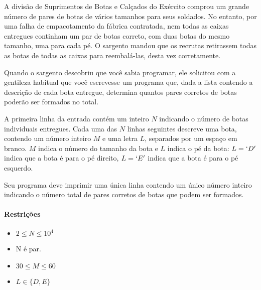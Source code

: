 %
%
%

A divisão de Suprimentos de Botas e Calçados do Exército comprou um grande número de pares de botas de vários tamanhos para seus soldados. No entanto, por uma falha de empacotamento da fábrica contratada, nem todas as caixas entregues continham um par de botas correto, com duas botas do mesmo tamanho, uma para cada pé. O sargento mandou que os recrutas retirassem todas as botas de todas as caixas para reembalá-las, desta vez corretamente.

Quando o sargento descobriu que você sabia programar, ele solicitou com a gentileza habitual que você escrevesse um programa que, dada a lista contendo a descrição de cada bota entregue, determina quantos pares corretos de botas poderão ser formados no total.

\Entrada%
A primeira linha da entrada contém um inteiro $N$ indicando o número de botas individuais entregues. Cada uma das $N$ linhas seguintes descreve uma bota, contendo um número inteiro $M$ e uma letra $L$, separados por um espaço em branco. $M$ indica o número do tamanho da bota e $L$ indica o pé da bota: $L = `D'$ indica que a bota é para o pé direito, $L = `E'$ indica que a bota é para o pé esquerdo.

\Saida%
Seu programa deve imprimir uma única linha contendo um único número inteiro indicando o número total de pares corretos de botas que podem ser formados.

\paragraph{Restrições}%
\begin{itemize}
	\item $2 \leq N \leq 10^4$
	\item N é par.
	\item $30 \leq M \leq 60$
	\item $L \in \{D, E\}$
\end{itemize}

%
